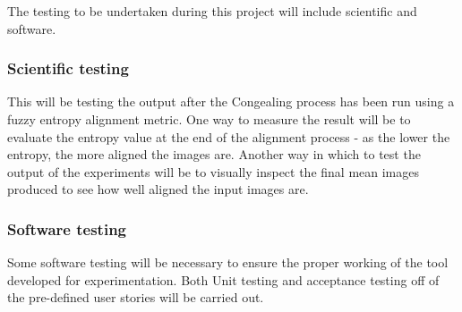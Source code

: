 The testing to be undertaken during this project will include scientific and software.

\subsubsection{Scientific testing}

This will be testing the output after the \Gls{Congealing} process has been run using a fuzzy entropy alignment metric. One way to measure the result will be to evaluate the entropy value at the end of the alignment process - as the lower the entropy, the more aligned the images are. Another way in which to test the output of the experiments will be to visually inspect the final mean images produced to see how well aligned the input images are.

\subsubsection{Software testing}

Some software testing will be necessary to ensure the proper working of the tool developed for experimentation. Both Unit testing and acceptance testing off of the pre-defined user stories will be carried out.
